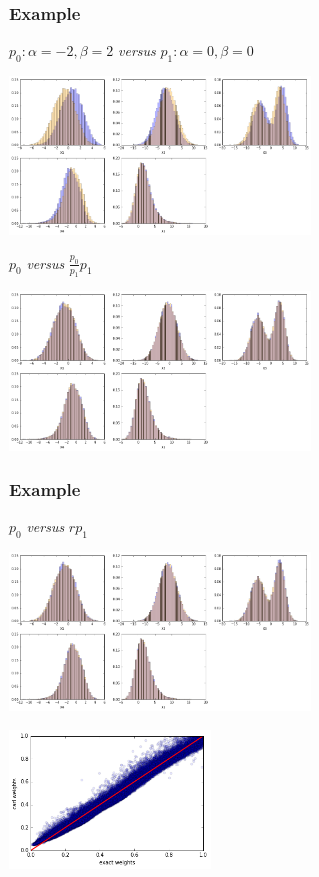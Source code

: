 \documentclass{beamer}
\begin{document}
\begin{frame}
    \frametitle{Example}

    $p_0 : \alpha=-2, \beta=2$ \textit{versus}
    $p_1 : \alpha=0, \beta=0$
    \begin{center}
        \includegraphics[width=0.6\textwidth]{figures/reweight1.png}
    \end{center}

    $p_0$  \textit{versus} $\frac{p_0}{p_1} p_1$
    \begin{center}
        \includegraphics[width=0.6\textwidth]{figures/reweight2.png}
    \end{center}
\end{frame}

\begin{frame}
    \frametitle{Example}

    $p_0$  \textit{versus} $\hat{r} p_1$
    \begin{center}
        \includegraphics[width=0.6\textwidth]{figures/reweight3.png}
    \end{center}

    \begin{center}
        \includegraphics[width=0.4\textwidth]{figures/reweight4.png}
    \end{center}
\end{frame}
\end{document}
